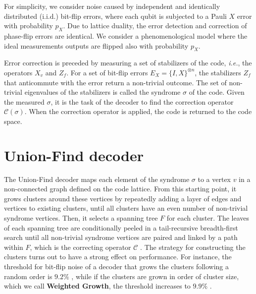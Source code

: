 For simplicity, we consider noise caused by independent and identically distributed (i.i.d.) bit-flip errors, where each qubit is subjected to a Pauli $X$ error with probability $p_X$. Due to {lattice duality}, the error detection and correction of phase-flip errors are identical. We consider a phenomenological model where the ideal measurements outputs are flipped also with probability $p_X$. 

Error correction is preceded by measuring a set of stabilizers of the code, \emph{i.e.}, the operators $X_v$ and $Z_f$. For a set of bit-flip errors $E_X = \{I,X\}^{\otimes n}$, the stabilizers $Z_f$ that anticommute with the error return a non-trivial outcome. The set of non-trivial eigenvalues of the stabilizers is called the syndrome $\sigma$ of the code. Given the measured $\sigma$, it is the task of the decoder to find the correction operator $\mathcal{C}(\sigma)$. When the correction operator is applied, the code is returned to the code space. %

\section{Union-Find decoder}\label{sec:unionfind}
The Union-Find decoder \cite{delfosse2017almost} maps each element of the syndrome $\sigma$ to a vertex $v$ in a non-connected graph defined on the code lattice. From this starting point, it grows clusters around these vertices by repeatedly adding a layer of edges and vertices to existing clusters, until all clusters have an even number of non-trivial syndrome vertices. %
Then, it selects a spanning tree $F$ for each cluster. %
The leaves of each spanning tree are conditionally peeled in a tail-recursive breadth-first search until all non-trivial syndrome vertices are paired and linked by a path within $F$, which is the correcting operator $\mathcal{C}$ \cite{delfosse2017almost}. The strategy for constructing the clusters turns out to have a strong effect on performance. For instance, the threshold for bit-flip noise of a decoder that grows the clusters following a random order is $9.2\%$ \cite{delfosse2017almost}, while if the clusters are grown in order of cluster size, which we call \textbf{Weighted Growth}, the threshold increases to $9.9\%$ \cite{delfosse2017almost}. %

